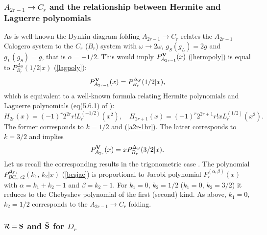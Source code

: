 \documentclass[a4paper,12pt]{article}
\begin{document}
\subsubsection{$A_{2r-1}\to C_r$ and the relationship between Hermite
and Laguerre polynomials}

As is well-known the Dynkin diagram folding $A_{2r-1}\to C_r$ relates
the $A_{2r-1}$ Calogero system to the $C_r$ ($B_r$) system with
$\omega\to2\omega$, $g_S(g_L)=2g$ and $g_L(g_S)=g$, that is $\alpha=-1/2$.
This would imply $P_{A_{2r-1}}^{\bf V}(x)$ (\ref{hermpoly}) is equal to
$P_{B_r}^{\Delta_S}(1/2|x)$ (\ref{lagpoly}):
\begin{equation}
   P_{A_{2r-1}}^{\bf V}(x)=P_{B_r}^{\Delta_S}(1/2|x),
   \label{a2r-1br}
\end{equation}
which is equivalent to a well-known formula relating Hermite polynomials
and Laguerre polynomials (eq(5.6.1) of \cite{szego}):
\begin{equation}
   H_{2r}(x)=(-1)^r2^{2r}r!L_r^{(-1/2)}(x^2),\quad
   H_{2r+1}(x)=(-1)^r2^{2r+1}r!xL_r^{(1/2)}(x^2).
   \label{hermlagrel}
\end{equation}
The former corresponds to $k=1/2$ and (\ref{a2r-1br}). The latter
corresponds to $k=3/2$ and implies
\begin{equation}
   P_{A_{2r}}^{\bf V}(x)=xP_{B_r}^{\Delta_S}(3/2|x).
\end{equation}
Let us recall the corresponding results in the trigonometric case
\cite{szego,cs}.
The polynomial $P_{BC_r,\,c2}^{\Delta_{S+}}(k_1,\,k_2|x)$ (\ref{bcsjac})
is proportional to Jacobi polynomial $P_{r}^{(\alpha,\beta)}(x)$
with $\alpha=k_1+k_2-1$ and $\beta=k_2-1$.
For $k_1=0$, $k_2=1/2$ ($k_1=0$, $k_2=3/2$) it reduces to the Chebyshev
polynomial of the first (second) kind. As above,
$k_1=0$, $k_2=1/2$ corresponds to the $A_{2r-1}\to C_r$ folding.

\subsubsection{${\cal R}={\bf S}$ and $\bar{\bf S}$ for $D_r$}
\end{document}

